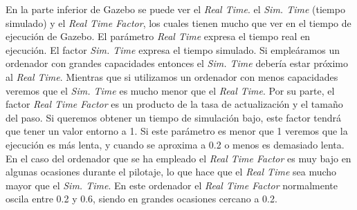 En la parte inferior de Gazebo se puede ver el \textit{Real Time}. el \textit{Sim. Time} (tiempo simulado) y el \textit{Real Time Factor}, los cuales tienen mucho que ver en el tiempo de ejecución de Gazebo. El parámetro \textit{Real Time} expresa el tiempo real en ejecución. El factor \textit{Sim. Time} expresa el tiempo simulado. Si empleáramos un ordenador con grandes capacidades entonces el \textit{Sim. Time} debería estar próximo al \textit{Real Time}. Mientras que si utilizamos un ordenador con menos capacidades veremos que el \textit{Sim. Time} es mucho menor que el \textit{Real Time}. Por su parte, el factor \textit{Real Time Factor} es un producto de la tasa de actualización y el tamaño del paso. Si queremos obtener un tiempo de simulación bajo, este factor tendrá que tener un valor entorno a 1. Si este parámetro es menor que 1 veremos que la ejecución es más lenta, y cuando se aproxima a 0.2 o menos es demasiado lenta.\\

En el caso del ordenador que se ha empleado el \textit{Real Time Factor} es muy bajo en algunas ocasiones durante el pilotaje, lo que hace que el \textit{Real Time} sea mucho mayor que el \textit{Sim. Time}. En este ordenador el \textit{Real Time Factor} normalmente oscila entre 0.2 y 0.6, siendo en grandes ocasiones cercano a 0.2.
